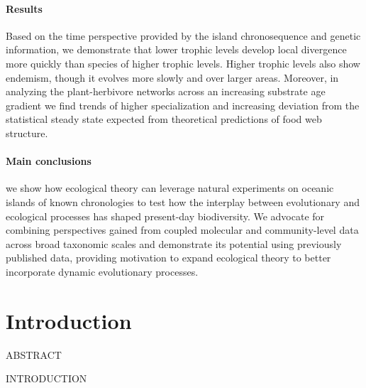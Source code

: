 \documentclass[12pt]{article}
\begin{document}
\begin{linenumbers}
\paragraph{Results}
Based on the time perspective provided by the island chronosequence
and genetic information, we demonstrate that lower trophic levels
develop local divergence more quickly than species of higher trophic
levels. Higher trophic levels also show endemism, though it evolves
more slowly and over larger areas. Moreover, in analyzing the
plant-herbivore networks across an increasing substrate age gradient
we find trends of higher specialization and increasing deviation from
the statistical steady state expected from theoretical predictions of
food web structure.

\paragraph{Main conclusions}
we show how ecological theory can leverage natural experiments on
oceanic islands of known chronologies to test how the interplay
between evolutionary and ecological processes has shaped present-day
biodiversity. We advocate for combining perspectives gained from
coupled molecular and community-level data across broad taxonomic
scales and demonstrate its potential using previously published data,
providing motivation to expand ecological theory to better incorporate
dynamic evolutionary processes.


\section*{Introduction}

ABSTRACT 

INTRODUCTION


\end{linenumbers}
\end{document}
